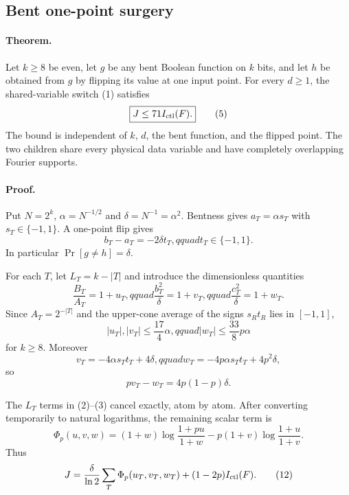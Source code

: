 \subsection*{Bent one-point surgery}

\paragraph{Theorem.}
Let $k\ge8$ be even, let $g$ be any bent Boolean function on $k$ bits, and
let $h$ be obtained from $g$ by flipping its value at one input point.
For every $d\ge1$, the shared-variable switch (1) satisfies
\[
 \boxed{J\le71 I_{\rm ctl}(F).}                           \tag{5}
\]
The bound is independent of $k$, $d$, the bent function, and the flipped
point.  The two children share every physical data variable and have
completely overlapping Fourier supports.

\paragraph{Proof.}
Put $N=2^k$, $\alpha=N^{-1/2}$ and $\delta=N^{-1}=\alpha^2$.  Bentness gives
$a_T=\alpha s_T$ with $s_T\in\{-1,1\}$.  A one-point flip gives
\[
 b_T-a_T=-2\delta t_T,qquad t_T\in\{-1,1\}.              \tag{6}
\]
In particular $\Pr[g\ne h]=\delta$.

For each $T$, let $L_T=k-|T|$ and introduce the dimensionless quantities
\[
 \frac{B_T}{A_T}=1+u_T,qquad
 \frac{b_T^2}{\delta}=1+v_T,qquad
 \frac{c_T^2}{\delta}=1+w_T.                             \tag{7}
\]
Since $A_T=2^{-|T|}$ and the upper-cone average of the signs $s_Rt_R$ lies
in $[-1,1]$,
\[
 |u_T|,|v_T|\le\frac{17}{4}\alpha,qquad
 |w_T|\le\frac{33}{8}p\alpha                            \tag{8}
\]
for $k\ge8$.  Moreover
\[
 v_T=-4\alpha s_Tt_T+4\delta,qquad
 w_T=-4p\alpha s_Tt_T+4p^2\delta,                        \tag{9}
\]
so
\[
 pv_T-w_T=4p(1-p)\delta.                                 \tag{10}
\]

The $L_T$ terms in (2)--(3) cancel exactly, atom by atom.  After converting
temporarily to natural logarithms, the remaining scalar term is
\[
 \Phi_p(u,v,w)
 =(1+w)\log\frac{1+pu}{1+w}
 -p(1+v)\log\frac{1+u}{1+v}.                             \tag{11}
\]
Thus
\[
 J=\frac{\delta}{\ln2}\sum_T\Phi_p(u_T,v_T,w_T)
 +(1-2p)I_{\rm ctl}(F).                                  \tag{12}
\]

